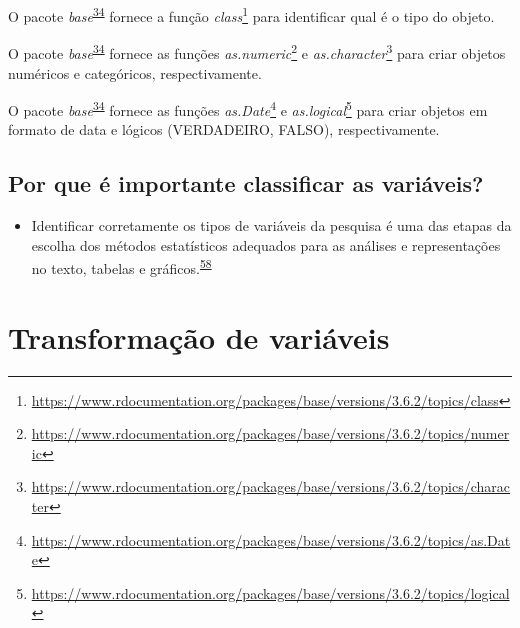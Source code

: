 \documentclass[
  a4paper,
]{book}
\providecommand{\tightlist}{%
  \setlength{\itemsep}{0pt}\setlength{\parskip}{0pt}}
\renewcommand{\href}[2]{#2\footnote{\url{#1}}}
\newenvironment{infobox}[1]
  {
  \begin{itemize}
  \renewcommand{\labelitemi}{
    \raisebox{-.7\height}[0pt][0pt]{
      {\setkeys{Gin}{width=3em,keepaspectratio}
        \texttt{[image: \#1]}}
    }
  }
  \setlength{\fboxsep}{1em}
  \begin{blackbox}
  \item
  }
  {
  \end{blackbox}
  \end{itemize}
  }
\begin{document}
\begin{infobox}{images/Rlogo}
O pacote \emph{base}\textsuperscript{\protect\hyperlink{ref-base-2}{34}} fornece a função \href{https://www.rdocumentation.org/packages/base/versions/3.6.2/topics/class}{\emph{class}} para identificar qual é o tipo do objeto.

\end{infobox}

\begin{infobox}{images/Rlogo}
O pacote \emph{base}\textsuperscript{\protect\hyperlink{ref-base-2}{34}} fornece as funções \href{https://www.rdocumentation.org/packages/base/versions/3.6.2/topics/numeric}{\emph{as.numeric}} e \href{https://www.rdocumentation.org/packages/base/versions/3.6.2/topics/character}{\emph{as.character}} para criar objetos numéricos e categóricos, respectivamente.

\end{infobox}

\begin{infobox}{images/Rlogo}
O pacote \emph{base}\textsuperscript{\protect\hyperlink{ref-base-2}{34}} fornece as funções \href{https://www.rdocumentation.org/packages/base/versions/3.6.2/topics/as.Date}{\emph{as.Date}} e \href{https://www.rdocumentation.org/packages/base/versions/3.6.2/topics/logical}{\emph{as.logical}} para criar objetos em formato de data e lógicos (VERDADEIRO, FALSO), respectivamente.

\end{infobox}

\hypertarget{por-que-uxe9-importante-classificar-as-variuxe1veis}{%
\subsection{Por que é importante classificar as variáveis?}\label{por-que-uxe9-importante-classificar-as-variuxe1veis}}

\begin{itemize}
\tightlist
\item
  Identificar corretamente os tipos de variáveis da pesquisa é uma das etapas da escolha dos métodos estatísticos adequados para as análises e representações no texto, tabelas e gráficos.\textsuperscript{\protect\hyperlink{ref-Dettori2018}{58}}
\end{itemize}

\hypertarget{transformacao}{%
\section{Transformação de variáveis}\label{transformacao}}
\end{document}
